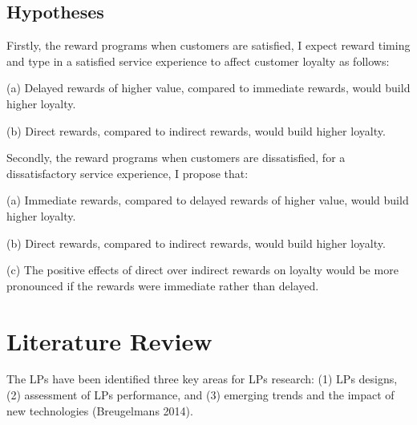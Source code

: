 \documentclass[12pt]{article}
\begin{document}
\begin{spacing}{1.5}
\subsection{Hypotheses}
Firstly, the reward programs when customers are satisfied, I expect reward timing and type in a satisfied service experience to affect customer loyalty as follows:

(a) Delayed rewards of higher value, compared to immediate rewards, would build higher loyalty.

(b) Direct rewards, compared to indirect rewards, would build higher loyalty.

Secondly, the reward programs when customers are dissatisfied, for a dissatisfactory service experience, I propose that:

(a) Immediate rewards, compared to delayed rewards of higher value, would build higher loyalty.

(b) Direct rewards, compared to indirect rewards, would build higher loyalty.

(c) The positive effects of direct over indirect rewards on loyalty would be more pronounced if the rewards were immediate rather than delayed.

\section{Literature Review}
The LPs have been identified three key areas for LPs research: (1) LPs designs, (2) assessment of LPs performance, and (3) emerging trends and the impact of new technologies (Breugelmans 2014)\cite{breugelmans2015advancing}.

\begin{figure}[h]

\centering
{}
\end{figure}
\end{spacing}
\end{document}
